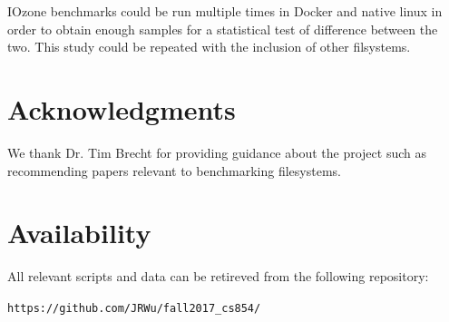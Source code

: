 \documentclass[letterpaper,twocolumn,10pt]{article}
\begin{document}
IOzone benchmarks could be run multiple times in Docker and native linux in order to obtain enough samples for a statistical test of difference between the two. This study could be repeated with the inclusion of other filsystems. 

\section{Acknowledgments}
We thank Dr. Tim Brecht for providing guidance about the project such as recommending papers relevant to benchmarking filesystems. 

\section{Availability}\label{Availability}
All relevant scripts and data can be retireved from the following repository:
\begin{center}
{\tt https://github.com/JRWu/fall2017\_cs854/}
\end{center}

{\footnotesize 

\theendnotes

\newpage
}
\end{document}
